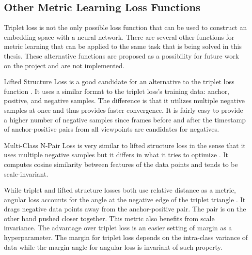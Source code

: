 \subsection{\label{sec:other-loss}Other Metric Learning Loss Functions}

Triplet loss is not the only possible loss function that can be used to construct an embedding space with a neural network. There are several other functions for metric learning that can be applied to the same task that is being solved in this thesis. These alternative functions are proposed as a possibility for future work on the project and are not implemented.

Lifted Structure Loss is a good candidate for an alternative to the triplet loss function \cite{lifted-structure}. It uses a similar format to the triplet loss's training data: anchor, positive, and negative samples. The difference is that it utilizes multiple negative samples at once and thus provides faster convergence. It is fairly easy to provide a higher number of negative samples since frames before and after the timestamp of anchor-positive pairs from all viewpoints are candidates for negatives.

Multi-Class N-Pair Loss is very similar to lifted structure loss in the sense that it uses multiple negative samples but it differs in what it tries to optimize \cite{multiclass-NIPS2016_6b180037}. It computes cosine similarity between features of the data points and tends to be scale-invariant. 

While triplet and lifted structure losses both use relative distance as a metric, angular loss accounts for the angle at the negative edge of the triplet triangle \cite{angular-loss}. It drags negative data points away from the anchor-positive pair. The pair is on the other hand pushed closer together. This metric also benefits from scale invariance. The advantage over triplet loss is an easier setting of margin as a hyperparameter. The margin for triplet loss depends on the intra-class variance of data while the margin angle for angular loss is invariant of such property.
